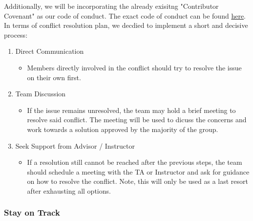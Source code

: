 \documentclass{article}
\begin{document}
Additionally, we will be incorporating the already exisitng 
"Contributor Covenant" as our code of conduct. 
The exact code of conduct can be found 
\href{https://www.contributor-covenant.org/version/2/1/code_of_conduct/}
{here}. \\

In terms of conflict resolution plan, we decdied to implement a short and decisive process: \\
\begin{enumerate}
  \item Direct Communication
  \begin{itemize}
    \item Members directly involved in the conflict should 
    try to resolve the issue on their own first. 
  \end{itemize}
  \item Team Discussion
  \begin{itemize}
    \item If the issue remains unresolved, the team may hold a brief
    meeting to resolve said conflict. The meeting will be used to dicuss
    the concerns and work towards a solution 
    approved by the majority of the group.
  \end{itemize}
  \item Seek Support from Advisor / Instructor
  \begin{itemize}
    \item If a resolution still cannot be reached after the previous steps,
    the team should schedule a meeting with the TA or Instructor and ask for 
    guidance on how to resolve the conflict. Note, this will only be used as
    a last resort after exhausting all options.
  \end{itemize}
\end{enumerate}

\subsubsection*{Stay on Track}


\end{document}

